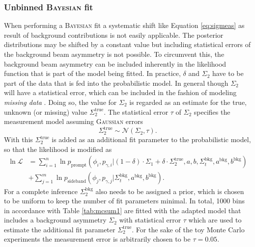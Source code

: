 \subsubsection{Unbinned \textsc{Bayesian} fit}
When performing a \textsc{Bayesian} fit a systematic shift like Equation \eqref{eq:sigmeas} as result of background contributions is not easily applicable. The posterior distributions may be shifted by a constant value but including statistical errors of the background beam asymmetry is not possible. To circumvent this, the background beam asymmetry can be included inherently in the likelihood function that is part of the model being fitted. In practice, $\delta$ and $\Sigma_2$ have to be part of the data that is fed into the probabilistic model. In general though $\Sigma_2$ will have a statistical error, which can be included in the fashion of modeling \emph{missing data} \cite{stan}. Doing so, the value for $\Sigma_2$ is regarded as an estimate for the true, unknown (or missing) value $\Sigma_2^\text{true}$. The statistical error $\tau$ of $\Sigma_2$ specifies the measurement model assuming \textsc{Gaussian} errors 
\begin{equation}
	\Sigma_2^\text{true}\sim\mathcal{N}\left(\Sigma_2,\tau\right).
\end{equation}
 With this $\Sigma_2^\text{true}$ is added as an additional fit parameter to the probabilistic model, so that the  likelihood is modified as  
 \begin{equation}
 	\begin{aligned}
 		\ln\mathcal{L}&=\sum_{i=1}^{n}\ln p_\text{prompt}\left(\phi_i,p_{\gamma,i}\big|(1-\delta)\cdot\Sigma_1+\delta\cdot\Sigma_2^\text{true},a,b,\Sigma^\text{bkg}_t,a^\text{bkg},b^\text{bkg}\right)\\&+\sum_{j=1}^m \ln p_\text{sideband}\left(\phi_j,p_{\gamma,j}\big|\Sigma^\text{bkg}_t,a^\text{bkg},b^\text{bkg}\right).\label{eq:likalt}
 	\end{aligned}
 \end{equation}
For a complete inference $\Sigma_2^\text{bkg}$ also needs to be assigned a prior, which is chosen to be uniform to keep the number of fit parameters minimal. In total, 1000 bins in accordance with Table \ref{tab:mcsum1} are fitted with the adapted model that includes a background asymmetry $\Sigma_2$ with statistical error $\tau$ which are used to estimate the additional fit parameter $\Sigma_2^\text{true}$. For the sake of the toy Monte Carlo experiments the measurement error is arbitrarily chosen to be $\tau=0.05$.


